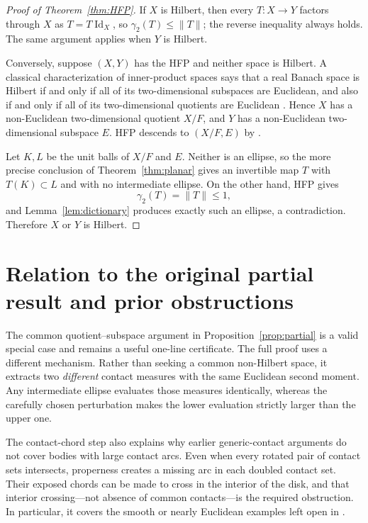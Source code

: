 \documentclass[11pt]{amsart}
\theoremstyle{definition}
\theoremstyle{remark}
\newcommand{\Id}{\operatorname{Id}}
\newcommand{\ga}{\gamma_2}
\begin{document}
\begin{proof}[Proof of Theorem~\ref{thm:HFP}]
If $X$ is Hilbert, then every $T:X\to Y$ factors through $X$ as
$T=T\Id_X$, so $\ga(T)\le\|T\|$; the reverse inequality always holds.  The
same argument applies when $Y$ is Hilbert.

Conversely, suppose $(X,Y)$ has the HFP and neither space is Hilbert.  A
classical characterization of inner-product spaces says that a real Banach
space is Hilbert if and only if all of its two-dimensional subspaces are
Euclidean, and also if and only if all of its two-dimensional quotients are
Euclidean \cite{Amir}.  Hence $X$ has a non-Euclidean two-dimensional quotient
$X/F$, and $Y$ has a non-Euclidean two-dimensional subspace $E$.  HFP descends
to $(X/F,E)$ by \cite[Proposition 5.4]{AMH-limit}.

Let $K,L$ be the unit balls of $X/F$ and $E$.  Neither is an ellipse, so the
more precise conclusion of Theorem~\ref{thm:planar} gives an invertible map
$T$ with $T(K)\subset L$ and with no intermediate ellipse.  On the other
hand, HFP gives
\[
 \gamma_2(T)=\|T\|\leq1,
\]
and Lemma~\ref{lem:dictionary} produces exactly such an ellipse, a
contradiction.  Therefore $X$ or $Y$ is Hilbert.
\end{proof}

\section{Relation to the original partial result and prior obstructions}

The common quotient--subspace argument in Proposition~\ref{prop:partial} is a
valid special case and remains a useful one-line certificate.  The full proof
uses a different mechanism.  Rather than seeking a common non-Hilbert space,
it extracts two \emph{different} contact measures with the same Euclidean
second moment.  Any intermediate ellipse evaluates those measures identically,
whereas the carefully chosen perturbation makes the lower evaluation strictly
larger than the upper one.

The contact-chord step also explains why earlier generic-contact arguments do
not cover bodies with large contact arcs.  Even when every rotated pair of
contact sets intersects, properness creates a missing arc in each doubled
contact set.  Their exposed chords can be made to cross in the interior of the
disk, and that interior crossing---not absence of common contacts---is the
required obstruction.  In particular, it covers the smooth or nearly
Euclidean examples left open in \cite[Section 5.2]{AMH-asymptotic}.
\end{document}
